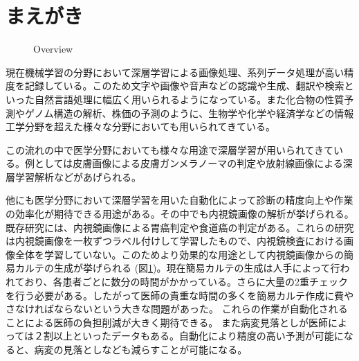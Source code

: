 \section{まえがき}

\begin{figure}[b]
    \centering
         \quad
         \quad
    \captionsetup{format=plain,font=normalsize,margin=30pt,name=図}
    \caption[]{Overview}
    \label{fig:overview}
\end{figure}

現在機械学習の分野において深層学習による画像処理\cite{CNN,AlexNet,VGG,ResNet}、系列データ処理\cite{RNN,GRU,LSTM,Transformer}が高い精度を記録している。このため文字や画像や音声などの認識\cite{DL_LVCSR,ImageNet}や生成\cite{GAN,VAE}、翻訳\cite{Transformer,Seq2Seq,effective_attention}や検索\cite{anxious_learning}といった自然言語処理に幅広く用いられるようになっている。また化合物の性質予測\cite{Chemistry1,Chemistry2}やゲノム構造の解析\cite{Genomics}、株価の予測\cite{stock_prediction}のように、生物学や化学や経済学などの情報工学分野を超えた様々な分野においても用いられてきている。

この流れの中で医学分野においても様々な用途で深層学習が用いられてきている。例としては皮膚画像による皮膚ガンメラノーマの判定\cite{skin_cancer_melanoma}や放射線画像による深層学習解析\cite{radiology}などがあげられる。

他にも医学分野において深層学習を用いた自動化によって診断の精度向上や作業の効率化が期待できる用途がある。その中でも内視鏡画像の解析が挙げられる。既存研究には、内視鏡画像による胃癌判定\cite{stomach_cancer}や食道癌\cite{esophageal_cancer}の判定がある。これらの研究は内視鏡画像を一枚ずつラベル付けして学習したもので、内視鏡検査における画像全体を学習していない。このためより効果的な用途として内視鏡画像からの簡易カルテの生成が挙げられる (図\ref{fig:overview})。現在簡易カルテの生成は人手によって行われており、各患者ごとに数分の時間がかかっている。さらに大量の2重チェックを行う必要がある。したがって医師の貴重な時間の多くを簡易カルテ作成に費やさなければならないという大きな問題があった。
これらの作業が自動化されることによる医師の負担削減が大きく期待できる。
また病変見落としが医師によっては２割以上といったデータ\cite{medical_problem2}もある。自動化により精度の高い予測が可能になると、病変の見落としなども減らすことが可能になる。

